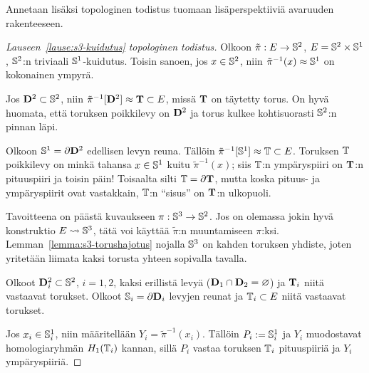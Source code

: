 Annetaan lisäksi topologinen todistus tuomaan lisäperspektiiviä avaruuden rakenteeseen.
\begin{proof}[Lauseen~\ref{lause:s3-kuidutus} topologinen todistus]
    Olkoon $\tilde{\pi}:E\to\S^2$, $E=\S^2\times\S^1$, $\S^2$:n triviaali $\S^1$-kuidutus. Toisin sanoen, jos $x\in\S^2$, niin $\tilde{\pi}^{-1}(x)\approx\S^1$ on kokonainen ympyrä.
    
    Jos $\D^2\subset\S^2$, niin $\tilde{\pi}^{-1}[\D^2]\approx\TT\subset E$, missä $\TT$ on täytetty torus. On hyvä huomata, että toruksen poikkilevy on $\D^2$ ja torus kulkee kohtisuorasti $\S^2$:n pinnan läpi.

    Olkoon $\S^1=\partial\D^2$ edellisen levyn reuna. Tällöin $\tilde{\pi}^{-1}[\S^1]\approx\T\subset E$. Toruksen $\T$ poikkilevy on minkä tahansa $x\in\S^1$ kuitu $\tilde{\pi}^{-1}(x)$; siis $\T$:n ympäryspiiri on $\TT$:n pituuspiiri ja toisin päin! Toisaalta silti $\T=\partial\TT$, mutta koska pituus- ja ympäryspiirit ovat vastakkain, $\T$:n ``sisus'' on $\TT$:n ulkopuoli.

    Tavoitteena on päästä kuvaukseen $\pi:\S^3\to\S^2$. Jos on olemassa jokin hyvä konstruktio $E\leadsto\S^3$, tätä voi käyttää $\tilde{\pi}$:n muuntamiseen $\pi$:ksi. Lemman~\ref{lemma:s3-torushajotus} nojalla $\S^3$ on kahden toruksen yhdiste, joten yritetään liimata kaksi torusta yhteen sopivalla tavalla.
    
    Olkoot $\D_i^2\subset\S^2$, $i=1,2$, kaksi erillistä levyä ($\D_1\cap\D_2=\varnothing$) ja $\TT_i$ niitä vastaavat torukset. Olkoot $\S_i=\partial\D_i$ levyjen reunat ja $\T_i\subset E$ niitä vastaavat torukset.

    Jos $x_i\in\S_i^1$, niin määritellään $Y_i=\tilde{\pi}^{-1}(x_i)$. Tällöin $P_i:=\S_i^1$ ja $Y_i$ muodostavat homologiaryhmän $H_1(\T_i)$ kannan, sillä $P_i$ vastaa toruksen $\T_i$ pituuspiiriä ja $Y_i$ ympäryspiiriä.


\end{proof}
